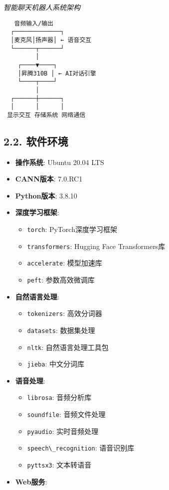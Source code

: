 \emph{智能聊天机器人系统架构}

\begin{lstlisting}
   音频输入/输出
  ┌─────────────┐
  │麦克风│扬声器│ ← 语音交互
  └──────┬──────┘
         │
    ┌────▼────┐
    │昇腾310B │ ← AI对话引擎
    └────┬────┘
         │
  ┌──────┼──────┐
  │      │      │
 显示交互 存储系统 网络通信
\end{lstlisting}

\subsection{2.2. 软件环境}\label{ux8f6fux4ef6ux73afux5883}

\begin{itemize}
\tightlist
\item
  \textbf{操作系统}: Ubuntu 20.04 LTS
\item
  \textbf{CANN版本}: 7.0.RC1
\item
  \textbf{Python版本}: 3.8.10
\item
  \textbf{深度学习框架}:

  \begin{itemize}
  \tightlist
  \item
    \passthrough{\lstinline!torch!}: PyTorch深度学习框架
  \item
    \passthrough{\lstinline!transformers!}: Hugging Face Transformers库
  \item
    \passthrough{\lstinline!accelerate!}: 模型加速库
  \item
    \passthrough{\lstinline!peft!}: 参数高效微调库
  \end{itemize}
\item
  \textbf{自然语言处理}:

  \begin{itemize}
  \tightlist
  \item
    \passthrough{\lstinline!tokenizers!}: 高效分词器
  \item
    \passthrough{\lstinline!datasets!}: 数据集处理
  \item
    \passthrough{\lstinline!nltk!}: 自然语言处理工具包
  \item
    \passthrough{\lstinline!jieba!}: 中文分词库
  \end{itemize}
\item
  \textbf{语音处理}:

  \begin{itemize}
  \tightlist
  \item
    \passthrough{\lstinline!librosa!}: 音频分析库
  \item
    \passthrough{\lstinline!soundfile!}: 音频文件处理
  \item
    \passthrough{\lstinline!pyaudio!}: 实时音频处理
  \item
    \passthrough{\lstinline!speech\_recognition!}: 语音识别库
  \item
    \passthrough{\lstinline!pyttsx3!}: 文本转语音
  \end{itemize}
\item
  \textbf{Web服务}:


\end{itemize}
